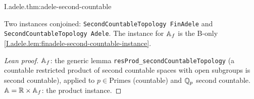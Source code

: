 \begin{theorem}
\end{theorem}
\begin{tfformal}{I.adele.thm:adele-second-countable}
\begin{tffidelity}
Two instances conjoined: \texttt{SecondCountableTopology FinAdele} and \texttt{SecondCountableTopology Adele}. The instance for $\mathbb{A}_f$ is the B-only \cref{I.adele.lem:finadele-second-countable-instance}.
\end{tffidelity}
\end{tfformal}
\begin{proof}[Lean proof]
$\mathbb{A}_f$: the generic lemma \texttt{resProd\_secondCountableTopology} (a countable restricted product of second countable spaces with open subgroups is second countable), applied to $p\in\mathrm{Primes}$ (countable) and $\mathbb{Q}_p$ second countable. $\mathbb{A}=\mathbb{R}\times\mathbb{A}_f$: the product instance.
\end{proof}

